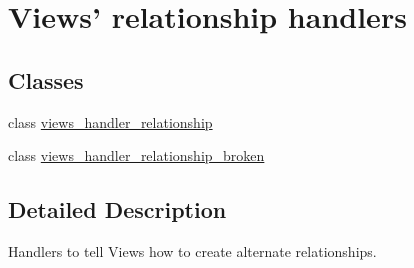\hypertarget{group__views__relationship__handlers}{
\section{Views' relationship handlers}
\label{group__views__relationship__handlers}
}
\subsection*{Classes}
\begin{CompactItemize}
\item 
class \hyperlink{classviews__handler__relationship}{views\_\-handler\_\-relationship}
\item 
class \hyperlink{classviews__handler__relationship__broken}{views\_\-handler\_\-relationship\_\-broken}
\end{CompactItemize}


\subsection{Detailed Description}
Handlers to tell Views how to create alternate relationships. 